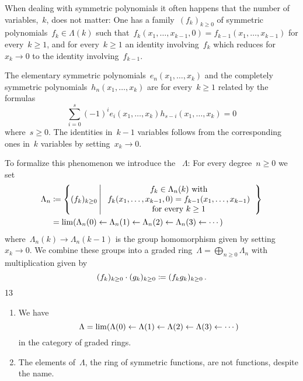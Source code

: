 \documentclass[a4paper,10pt]{scrartcl}
\begin{document}
When dealing with symmetric polynomials it often happens that the number of variables,~$k$, does not matter:
One has a family~$(f_k)_{k \geq 0}$ of symmetric polynomials~$f_k \in \Lambda(k)$ such that~$f_k(x_1, \dotsc, x_{k-1}, 0) = f_{k-1}(x_1, \dotsc, x_{k-1})$ for every~$k \geq 1$, and for every~$k \geq 1$ an identity involving~$f_k$ which reduces for~$x_k \to 0$ to the identity involving~$f_{k-1}$.

\begin{example}
  The elementary symmetric polynomials~$e_n(x_1, \dotsc, x_k)$ and the completely symmetric polynomials~$h_n(x_1, \dotsc, x_k)$ are for every~$k \geq 1$ related by the formulas
  \[
    \sum_{i=0}^s (-1)^i e_i(x_1, \dotsc, x_k) h_{s-i}(x_1, \dotsc, x_k) = 0
  \]
  where~$s \geq 0$.
  The identities in~$k-1$ variables follows from the corresponding ones in~$k$ variables by setting~$x_k \to 0$.
\end{example}

To formalize this phenomenon we introduce the ~$\Lambda$:
For every degree~$n \geq 0$ we set
\begin{align*}
  \Lambda_n
  &\defined
  \left\{
    (f_k)_{k \geq 0}
  \suchthat*
    \begin{tabular}{c}
      $f_k \in \Lambda_n(k)$ with \\
      $f_k(x_1, \dotsc, x_{k-1}, 0) = f_{k-1}(x_1, \dotsc, x_{k-1})$ \\
      for every~$k \geq 1$
    \end{tabular}
  \right\}
  \\
  &=
  \lim( \Lambda_n(0) \from \Lambda_n(1) \from \Lambda_n(2) \from \Lambda_n(3) \from \dotsb)
\end{align*}
where~$\Lambda_n(k) \to \Lambda_n(k-1)$ is the group homomorphism given by setting  ~$x_k \to 0$.
We combine these groups into a graded ring~$\Lambda = \bigoplus_{n \geq 0} \Lambda_n$ with multiplication given by
\[
  (f_k)_{k \geq 0} \cdot (g_k)_{k \geq 0}
  \coloneqq
  (f_k g_k)_{k \geq 0} \,.
\]13

\begin{remark}
  \leavevmode
  \begin{enumerate}
    \item
      We have
      \[
        \Lambda
        =
        \lim( \Lambda(0) \leftarrow \Lambda(1) \leftarrow \Lambda(2) \leftarrow \Lambda(3) \leftarrow \dotsb)
      \]
      in the category of graded rings.
    \item
      The elements of~$\Lambda$, the ring of symmetric functions, are not functions, despite the name.
  \end{enumerate}
\end{remark}
\end{document}

